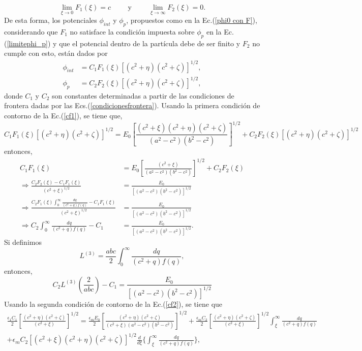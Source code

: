 \documentclass[paper=letter, fontsize=12pt,]{article}
\begin{document}
\begin{equation}
    \lim_{\xi \to 0}F_1(\xi)=c\hspace{1cm}\mbox{y}\hspace{1cm} \lim_{\xi \to \infty}F_2(\xi)=0.
\end{equation}
De esta forma, los potenciales $\phi_{int}$ y $\phi_p$, propuestos como en la Ec.(\ref{phi0 con F}), considerando que $F_1$ no satisface la condición impuesta sobre $\phi_p$ en la Ec. (\ref{limitephi_p}) y que el potencial dentro de la partícula debe de ser finito y $F_2$ no cumple con esto, están dados por
\begin{align}
    \phi_{int}&=C_1F_1(\xi)[(c^2+\eta)(c^2+\zeta)]^{1/2}\label{phi_int},\\
    \phi_p&=C_2F_2(\xi)[(c^2+\eta)(c^2+\zeta)]^{1/2}\label{phi_p},
\end{align}
donde $C_1$ y $C_2$ son constantes determinadas a partir de las condiciones de frontera dadas por las Ecs.(\ref{condicionesfrontera}). Usando la primera condición de contorno de la Ec.(\ref{cf1}), se tiene que,
\begin{equation}
    C_1F_1(\xi)[(c^2+\eta)(c^2+\zeta)]^{1/2}=E_0\left[\frac{(c^2+\xi)(c^2+\eta)(c^2+\zeta)}{(a^2-c^2)(b^2-c^2)}\right]^{1/2}+C_2F_2(\xi)[(c^2+\eta)(c^2+\zeta)]^{1/2}
\end{equation}
entonces, 
\begin{align}
    C_1F_1(\xi)&=E_0\left[\frac{(c^2+\xi)}{(a^2-c^2)(b^2-c^2)}\right]^{1/2}+C_2F_2(\xi)\nonumber\\
    \Rightarrow \frac{C_2F_2(\xi)-C_1F_1(\xi)}{(c^2+\xi)^{1/2}}&=\frac{E_0}{[(a^2-c^2)(b^2-c^2)]^{1/2}}\nonumber\\
    \Rightarrow \frac{C_2 F_1(\xi)\int_{0}^{\infty}\frac{dq}{(c^2+q)f(q)}-C_1F_1(\xi)}{(c^2+\xi)^{1/2}}&=\frac{E_0}{[(a^2-c^2)(b^2-c^2)]^{1/2}}\nonumber\\
    \Rightarrow C_2 \int_{0}^{\infty}\frac{dq}{(c^2+q)f(q)}-C_1&=\frac{E_0}{[(a^2-c^2)(b^2-c^2)]^{1/2}}.
\end{align}
Si definimos
\begin{equation}
    L^{(3)}=\frac{abc}{2}\int_{0}^{\infty}\frac{dq}{(c^2+q)f(q)},
\end{equation}
entonces,
\begin{equation}
    C_2L^{(3)}\left(\frac{2}{abc}\right)-C_1=\frac{E_0}{[(a^2-c^2)(b^2-c^2)]^{1/2}}
    \label{ec1 de cf}
\end{equation}
Usando la segunda condición de contorno de la Ec.(\ref{cf2}), se tiene que
\begin{multline*}
    \frac{\epsilon_1C_1}{2}\left[\frac{(c^2+\eta)(c^2+\zeta)}{(c^2+\xi)}\right]^{1/2}=\frac{\epsilon_mE_0}{2}\left[\frac{(c^2+\eta)(c^2+\zeta)}{(c^2+\xi)(a^2-c^2)(b^2-c^2)}\right]^{1/2}+\frac{\epsilon_m C_2}{2}\left[\frac{(c^2+\eta)(c^2+\zeta)}{(c^2+\xi)}\right]^{1/2}\int_{\xi}^{\infty}\frac{dq}{(c^2+q)f(q)}\\
    +\epsilon_mC_2[(c^2+\xi)(c^2+\eta)(c^2+\zeta)]^{1/2}\frac{d}{d\xi}\Bigg\{\int_{\xi}^{\infty}\frac{dq}{(c^2+q)f(q)}\Bigg\},
\end{multline*}
\end{document}
